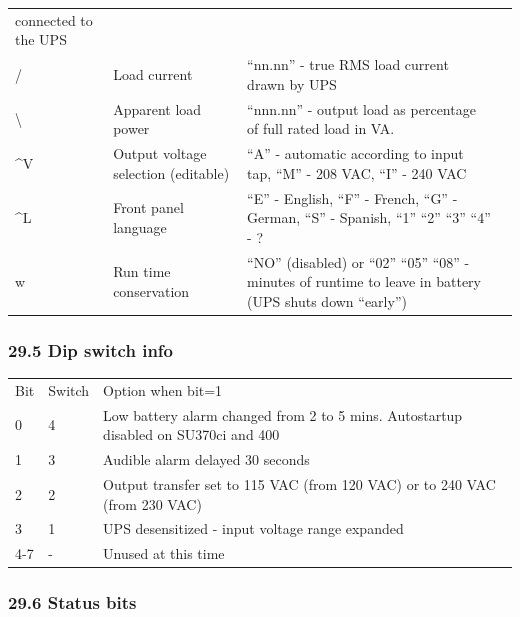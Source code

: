 {{{{{{{{{{{{{{{{{\begin{longtable}{p{0.5in}p{2.25in}p{2.25in}l}
{connected to the UPS} & { 
 } \\
{/} & {Load current} & {``nn.nn'' - true RMS load current drawn by UPS} & { 
 } \\
{\textbackslash{}} & {Apparent load power} & {``nnn.nn'' - output load as
percentage of full rated load in VA.} & { 
 } \\
{\^{}V} & {Output voltage selection (editable)} & {``A'' - automatic according
to input tap, ``M'' - 208 VAC, ``I'' - 240 VAC} & { 
 } \\
{\^{}L} & {Front panel language} & {``E'' - English, ``F'' - French, ``G'' -
German, ``S'' - Spanish, ``1'' ``2'' ``3'' ``4'' - ?} & { 
 } \\
{w} & {Run time conservation} & {``NO'' (disabled) or ``02'' ``05'' ``08'' -
minutes of runtime to leave in battery (UPS shuts down ``early'')} & {  
}

\end{longtable}

\label{Dip-switch-info}

\subsubsection*{29.5 Dip switch info}

\begin{longtable}{p{0.5in}p{0.5in}p{4in}}
{Bit} & {Switch} & {Option when bit=1 
 } \\
{0} & {4} & {Low battery alarm changed from 2 to 5 mins. Autostartup disabled
on SU370ci and 400 
 } \\
{1} & {3} & {Audible alarm delayed 30 seconds 
 } \\
{2} & {2} & {Output transfer set to 115 VAC (from 120 VAC) or to 240 VAC (from
230 VAC) 
 } \\
{3} & {1} & {UPS desensitized - input voltage range expanded 
 } \\
{4-7} & {-} & {Unused at this time 
}

\end{longtable}

\label{Status-bits}

\subsubsection*{29.6 Status bits}

}}}}}}}}}}}}}}}}}
